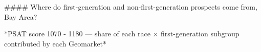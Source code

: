 #### Where do first-generation and non-first-generation prospects come from, Bay Area?

*PSAT score 1070 - 1180 — share of each race × first-generation subgroup contributed by each Geomarket*
